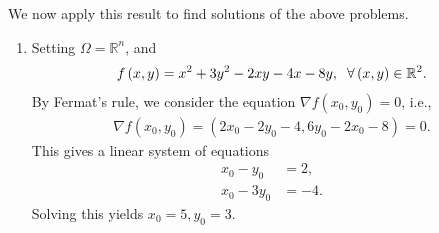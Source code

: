 \documentclass[a4paper]{article}
\numberwithin{equation}{section}
\begin{document}
We now apply this result to find solutions of the above problems.
\begin{enumerate}
\item Setting $\Omega =\mathbb{R}^n$, and
\begin{align}
f\left( {x,y} \right) = {x^2} + 3{y^2} - 2xy - 4x - 8y,\hspace{0.2cm} \forall \left( {x,y} \right) \in {\mathbb{R}^2}.
\end{align}
By Fermat's rule, we consider the equation $\nabla f\left( {{x_0},{y_0}} \right) = 0$, i.e.,
\begin{align}
\nabla f\left( {{x_0},{y_0}} \right) = \left( {2{x_0} - 2{y_0} - 4,6{y_0} - 2{x_0} - 8} \right) = 0.
\end{align}
This gives a linear system of equations
\begin{align}
{x_0} - {y_0} &= 2,\\
{x_0} - 3{y_0} &=  - 4.
\end{align}
Solving this yields $x_0=5,y_0=3$. 


\end{enumerate}
\end{document}
